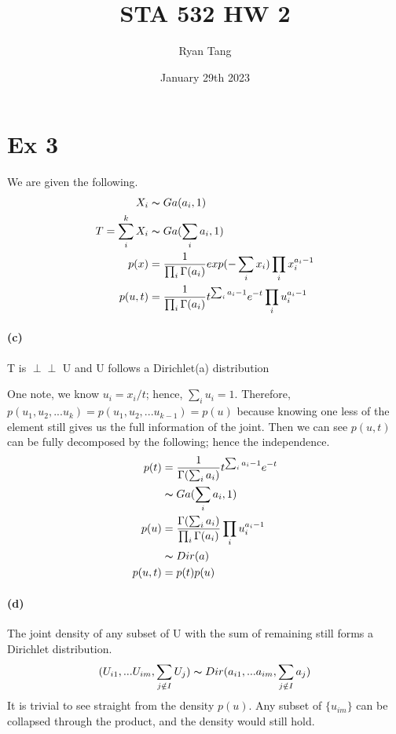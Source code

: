 \documentclass[11pt, letterpaper]{article}
\author{Ryan Tang}
\title{STA 532 HW 2}
\date{January 29th 2023}
\newcommand{\indep}{\perp \!\!\! \perp}
\begin{document}
\maketitle

\section{Ex 3}
We are given the following.
\begin{align*}
    X_i &\thicksim Ga(a_i, 1) \\
    T = \sum_i^k X_i &\thicksim Ga(\sum_i a_i, 1) \\
    p(x) &= \frac{1}{\prod_i \Gamma(a_i)} exp(-\sum_i x_i) \prod_i x_i^{a_i-1} \\
    p(u, t) &= \frac{1}{\prod_i \Gamma(a_i)} t^{\sum_i a_i - 1} e^{-t} \prod_i u_i^{a_i-1}
\end{align*}
\paragraph{(c)} T is $\indep$ U and U follows a Dirichlet(a) distribution

One note, we know $u_i = x_i / t$; hence, $\sum_i u_i = 1$. Therefore, $p(u_1, u_2, ... u_k) = p(u_1, u_2, ... u_{k-1}) = p(u)$ because knowing one less of the element still gives us the full information of the joint. Then we can see $p(u, t)$ can be fully decomposed by the following; hence the independence. 
\begin{align*}
    p(t) &= \frac{1}{\Gamma(\sum_i a_i)} t^{\sum_i a_i -1} e^{-t} \\
         &\thicksim Ga(\sum_i a_i, 1) \\
    p(u) &= \frac{\Gamma(\sum_i a_i)}{\prod_i \Gamma(a_i)} \prod_i u_i^{a_i-1} \\
         &\thicksim Dir(a) \\
    p(u, t) &= p(t) p(u)
\end{align*}

\paragraph{(d)} The joint density of any subset of U with the sum of remaining still forms a Dirichlet distribution.
$$
(U_{i1}, ... U_{im}, \sum_{j\notin I} U_j) \thicksim Dir(a_{i1}, ... a_{im}, \sum_{j\notin I} a_j)
$$
It is trivial to see straight from the density $p(u)$. Any subset of $\{u_{im}\}$ can be collapsed through the product, and the density would still hold.
\end{document}
